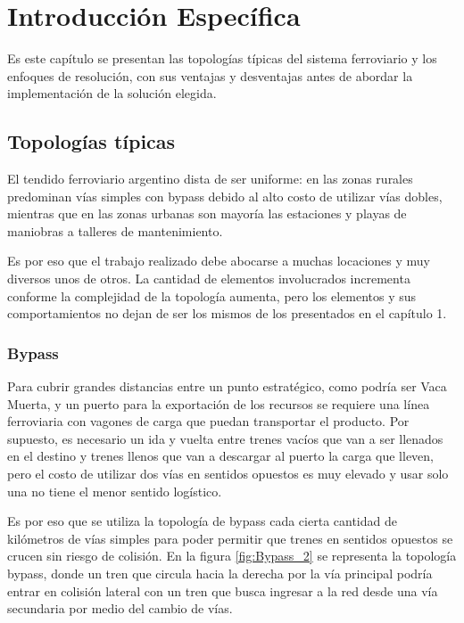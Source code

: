 \chapter{Introducción Específica} %

\label{Chapter2}

Es este capítulo se presentan las topologías típicas del sistema ferroviario y los enfoques de resolución, con sus ventajas y desventajas antes de abordar la implementación de la solución elegida.

\section{Topologías típicas}
\label{Topologias}	
	El tendido ferroviario argentino dista de ser uniforme: en las zonas rurales predominan vías simples con bypass debido al alto costo de utilizar vías dobles, mientras que en las zonas urbanas son mayoría las estaciones y playas de maniobras a talleres de mantenimiento.
	
	Es por eso que el trabajo realizado debe abocarse a muchas locaciones y muy diversos unos de otros. La cantidad de elementos involucrados incrementa conforme la complejidad de la topología aumenta, pero los elementos y sus comportamientos no dejan de ser los mismos de los presentados en el capítulo 1.

	\subsection{Bypass}

		Para cubrir grandes distancias entre un punto estratégico, como podría ser Vaca Muerta, y un puerto para la exportación de los recursos se requiere una línea ferroviaria con vagones de carga que puedan transportar el producto. Por supuesto, es necesario un ida y vuelta entre trenes vacíos que van a ser llenados en el destino y trenes llenos que van a descargar al puerto la carga que lleven, pero el costo de utilizar dos vías en sentidos opuestos es muy elevado y usar solo una no tiene el menor sentido logístico.
		
		Es por eso que se utiliza la topología de bypass cada cierta cantidad de kilómetros de vías simples para poder permitir que trenes en sentidos opuestos se crucen sin riesgo de colisión. En la figura \ref{fig:Bypass_2} se representa la topología bypass, donde un tren que circula hacia la derecha por la vía principal podría entrar en colisión lateral con un tren que busca ingresar a la red desde una vía secundaria por medio del cambio de vías.
		
